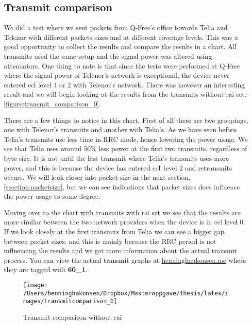 \documentclass[USenglish]{ifimaster}  %
\begin{document}
\subsection{Transmit comparison}
We did a test where we sent packets from Q-Free's office towards Telia and Telenor with different packets sizes and at different coverage levels. This was a good opportunity to collect the results and compare the results in a chart. All transmits used the same setup and the signal power was altered using attenuators. One thing to note is that since the tests were performed at Q-Free where the signal power of Telenor's network is exceptional, the device never entered \acrshort{ecl} level 1 or 2 with Telenor's network. There was however an interesting result and we will begin looking at the results from the transmits without \acrshort{rai} set, \vref{figure:transmit_comparison_0}.

There are a few things to notice in this chart. First of all there are two groupings, one with Telenor's transmits and another with Telia's. As we have seen before Telia's transmits use less time in RRC mode, hence lowering the power usage. We see that Telia uses around 50\% less power at the first two transmits, regardless of byte size. It is not until the last transmit where Telia's transmits uses more power, and this is because the device has entered \acrshort{ecl} level 2 and retransmits occurs.
We will look closer into packet size in the next section, \vref{ssection:packetsize}, but we can see indications that packet sizes does influence the power usage to some degree.

Moving over to the chart with transmits with \acrshort{rai} set we see that the results are more similar between the two network providers when the device is in \acrshort{ecl} level 0. If we look closely at the first transmits from Telia we can see a bigger gap between packet sizes, and this is mainly because the RRC period is not influencing the results and we get more information about the actual transmit process.
You can view the actual transmit graphs at \url{henninghaakonsen.me} where they are tagged with \textbf{60\_1}.

\begin{figure}[H]
  \centering\texttt{[image: /Users/henninghakonsen/Dropbox/Masteroppgave/thesis/latex/images/transmitcomparison\_0]}
  \caption{Transmit comparison without \acrshort{rai}}
  \label{figure:transmit_comparison_0}
\end{figure}
\end{document}
